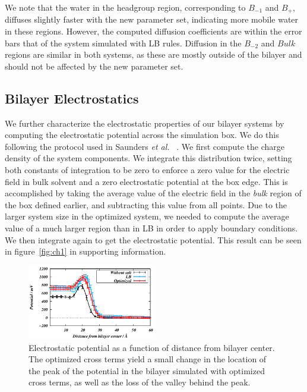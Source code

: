 \documentclass[12pt,openany,final]{book}
\newcommand{\etal}{\textit{et al.}}
\begin{document}
We note that the water in the headgroup region, corresponding to $B_{-1}$ and $B_+$, 
diffuses slightly faster with the new parameter set, 
indicating more mobile water in these regions. 
However, the computed diffusion coefficients are within the error bars that of the system simulated with LB rules. 
Diffusion in the $B_{-2}$ and $Bulk$ regions are similar in both systems, 
as these are mostly outside of the bilayer and should not be affected by the new parameter set.


\subsection{Bilayer Electrostatics}

We further characterize the electrostatic properties of our bilayer
systems by computing the electrostatic potential across the simulation box. 
We do this following the protocol used in Saunders \etal
~\cite{saunders:2019}. We first compute the charge density of the
system components. We integrate this distribution twice, setting both
constants of integration to be zero to enforce a zero value for the
electric field in bulk solvent and a zero electrostatic potential at
the box edge. This is accomplished by taking the average value of the
electric field in the \emph{bulk} region of the box defined earlier,
and subtracting this value from all points. Due to the larger system
size in the optimized system, we needed to compute the average value of a much
larger region than in LB in order to apply boundary conditions. We
then integrate again to get the electrostatic potential. This result
can be seen in figure~\ref{fig:ch1} in supporting information. 
\begin{figure}[h!]
    \caption[Electrostatic potential]{ Electrostatic potential as a function of distance from bilayer center. The optimized
cross terms yield a small change in the location of the peak of the potential in the
bilayer simulated with optimized cross terms, as well as the loss of the valley behind the peak.
}
    \label{fig:potential:ch1}
    \includegraphics[width=0.5\textwidth,trim=-0cm 0 0 0]{figure_s3_ch1.eps}
\end{figure}
\end{document}
